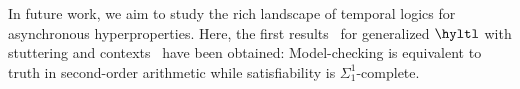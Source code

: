 In future work, we aim to study the rich landscape of temporal logics for asynchronous hyperproperties. 
Here, the first results~\cite{rz25} for generalized $\hyltl$ with stuttering and contexts~\cite{DBLP:journals/corr/abs-2404-16778} have been obtained: 
Model-checking is equivalent to truth in second-order arithmetic while satisfiability is $\Sigma_1^1$-complete.
